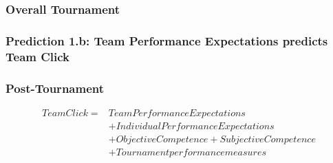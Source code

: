  \subsubsection{Overall Tournament}




 \subsubsection{Prediction 1.b: Team Performance Expectations predicts Team Click}


 \subsubsection{Post-Tournament}

   \begin{align*}
     Team Click =  & Team Performance Expectations \\
               &+ Individual Performance Expectations \\
               &+ Objective Competence + Subjective Competence \\
               &+ Tournament performance measures \\
   \end{align*}


      



